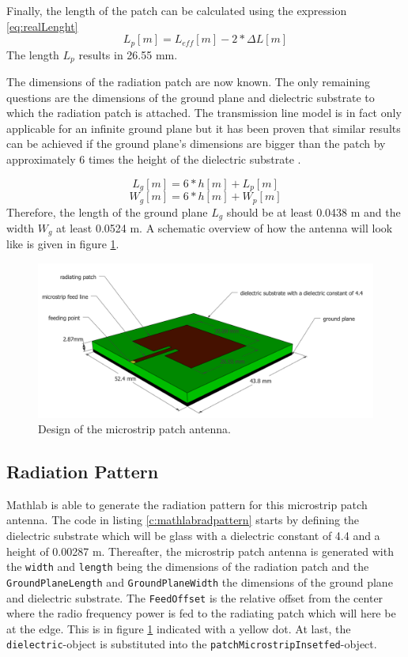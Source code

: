 Finally, the length of the patch can be calculated using the expression \ref{eq:realLenght}
\begin{equation} 
L_p [m]= L_{eff} [m] - 2 * \Delta L [m]
\label{eq:realLenght}
\end{equation}
The length $L_p$ results in 26.55 mm.

The dimensions of the radiation patch are now known. The only remaining questions are the dimensions of the ground plane and dielectric substrate to which the 
radiation patch is attached. The transmission line model is in fact only applicable for an infinite ground plane but it has been proven that similar results
can be achieved if the ground plane's dimensions are bigger than the patch by approximately 6 times the height of the dielectric substrate \cite{J14_antennadesign,J15_antennadesign}.

\begin{equation} 
L_{g} [m] = 6 * h [m] + L_p [m]
\end{equation}
\begin{equation} 
W_{g} [m] = 6 * h [m] + W_p [m]
\end{equation}
Therefore, the length of the ground plane $L_{g}$ should be at least 0.0438 m and the width $W_{g}$ at least 0.0524 m.
A schematic overview of how the antenna will look like is given in figure \ref{fig:antennadesign}.
\begin{figure}[h!]
\centering
  \includegraphics[width=\textwidth]{../images/MicrostripAntenna.png}
  \caption{Design of the microstrip patch antenna.}
  \label{fig:antennadesign}
\end{figure}

\subsection{Radiation Pattern}
Mathlab is able to generate the radiation pattern for this microstrip patch antenna.
The code in  listing \ref{c:mathlabradpattern} starts by defining the dielectric substrate which will be glass with a \gls{dielectric constant}
of 4.4 and a height of 0.00287 m. Thereafter, the microstrip patch antenna is generated with the \verb|width| and \verb|length| being the dimensions
of the radiation patch and the \verb|GroundPlaneLength| and \verb|GroundPlaneWidth| the dimensions of the ground plane and dielectric substrate.
The \verb|FeedOffset| is the relative offset from the center where the radio frequency power is fed to the radiating patch which will here be
at the edge. This is in figure \ref{fig:antennadesign} indicated with a yellow dot. At last, the \verb|dielectric|-object is substituted into the 
\verb|patchMicrostripInsetfed|-object.

